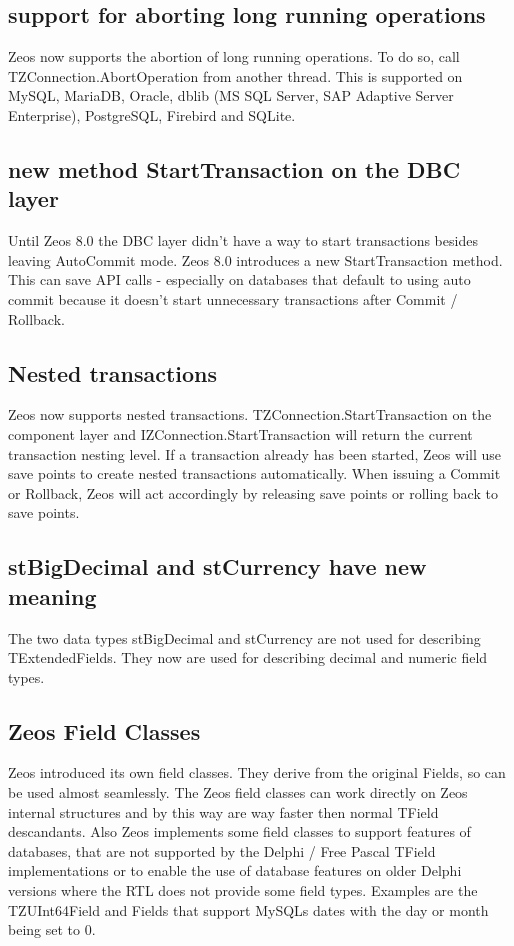 \documentclass[a4paper,12pt,oneside]{article}
\begin{document}
\subsection{support for aborting long running operations}
Zeos now supports the abortion of long running operations.
To do so, call TZConnection.AbortOperation from another thread.
This is supported on MySQL, MariaDB, Oracle, dblib (MS SQL Server, SAP Adaptive Server Enterprise), PostgreSQL, Firebird and SQLite.

\subsection{new method StartTransaction on the DBC layer}
Until Zeos 8.0 the DBC layer didn't have a way to start transactions besides leaving AutoCommit mode.
Zeos 8.0 introduces a new StartTransaction method.
This can save API calls - especially on databases that default to using auto commit because it doesn't start unnecessary transactions after Commit / Rollback.

\subsection{Nested transactions}
Zeos now supports nested transactions. TZConnection.StartTransaction on the component layer and IZConnection.StartTransaction will return the current transaction nesting level.
If a transaction already has been started, Zeos will use save points to create nested transactions automatically.
When issuing a Commit or Rollback, Zeos will act accordingly by releasing save points or rolling back to save points.

\subsection{stBigDecimal and stCurrency have new meaning}
The two data types stBigDecimal and stCurrency are not used for describing TExtendedFields.
They now are used for describing decimal and numeric field types.

\subsection{Zeos Field Classes}
Zeos introduced its own field classes.
They derive from the original Fields, so can be used almost seamlessly.
The Zeos field classes can work directly on Zeos internal structures and by this way are way faster then normal TField descandants.
Also Zeos implements some field classes to support features of databases, that are not supported by the Delphi / Free Pascal TField implementations or to enable the use of database features on older Delphi versions where the RTL does not provide some field types.
Examples are the TZUInt64Field and Fields that support MySQLs dates with the day or month being set to 0.
\end{document}
